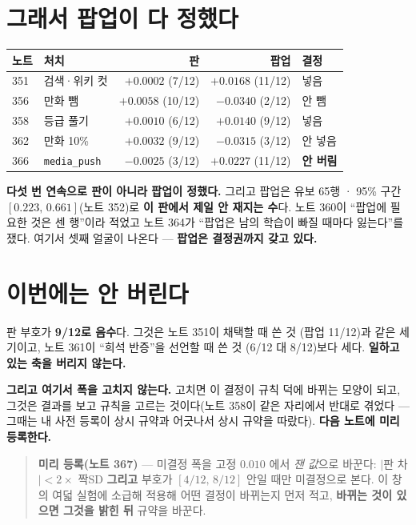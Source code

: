 \documentclass[11pt]{article}
\begin{document}
\section{그래서 팝업이 다 정했다}

\begin{center}
\begin{tabular}{llrrl}
\hline
노트 & 처치 & 판 & 팝업 & 결정 \\
\hline
351 & 검색·위키 컷 & $+0.0002$ (7/12) & $+0.0168$ (11/12) & 넣음 \\
356 & 만화 뺌      & $+0.0058$ (10/12) & $-0.0340$ (2/12) & 안 뺌 \\
358 & 등급 풀기    & $+0.0010$ (6/12) & $+0.0140$ (9/12) & 넣음 \\
362 & 만화 10\%    & $+0.0032$ (9/12) & $-0.0315$ (3/12) & 안 넣음 \\
366 & \texttt{media\_push} & $-0.0025$ (3/12) & $+0.0227$ (11/12) & \textbf{안 버림} \\
\hline
\end{tabular}
\end{center}

\textbf{다섯 번 연속으로 판이 아니라 팝업이 정했다.} 그리고 팝업은 유보
65행 · 95\% 구간 $[0.223,\,0.661]$(노트 352)로 \textbf{이 판에서 제일 안
재지는 수}다. 노트 360이 ``팝업에 필요한 것은 센 행''이라 적었고 노트
364가 ``팝업은 남의 학습이 빠질 때마다 잃는다''를 쟀다. 여기서 셋째 얼굴이
나온다 --- \textbf{팝업은 결정권까지 갖고 있다.}

\section{이번에는 안 버린다}

판 부호가 \textbf{9/12로 음수}다. 그것은 노트 351이 채택할 때 쓴 것
(팝업 11/12)과 같은 세기이고, 노트 361이 ``희석 반증''을 선언할 때 쓴 것
(6/12 대 8/12)보다 세다. \textbf{일하고 있는 축을 버리지 않는다.}

\textbf{그리고 여기서 폭을 고치지 않는다.} 고치면 이 결정이 규칙 덕에
바뀌는 모양이 되고, 그것은 결과를 보고 규칙을 고르는 것이다(노트 358이
같은 자리에서 반대로 겪었다 --- 그때는 내 사전 등록이 상시 규약과
어긋나서 상시 규약을 따랐다). \textbf{다음 노트에 미리 등록한다.}

\begin{quote}
\textbf{미리 등록(노트 367)} --- 미결정 폭을 고정 $0.010$ 에서
\emph{잰 값}으로 바꾼다: $|$판 차$| < 2 \times$ 짝SD \textbf{그리고}
부호가 $[4/12,\,8/12]$ 안일 때만 미결정으로 본다. 이 창의 여덟 실험에
소급해 적용해 어떤 결정이 바뀌는지 먼저 적고, \textbf{바뀌는 것이 있으면
그것을 밝힌 뒤} 규약을 바꾼다.
\end{quote}
\end{document}
